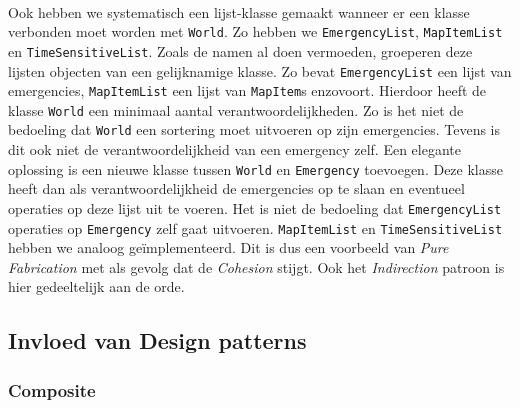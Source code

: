 \paragraph{}
Ook hebben we systematisch een lijst-klasse gemaakt wanneer er een klasse verbonden moet worden met \texttt{World}. Zo hebben we \texttt{EmergencyList}, \texttt{MapItemList} en \texttt{TimeSensitiveList}. Zoals de namen al doen vermoeden, groeperen deze lijsten objecten van een gelijknamige klasse. Zo bevat \texttt{EmergencyList} een lijst van emergencies, \texttt{MapItemList} een lijst van \texttt{MapItem}s enzovoort. Hierdoor heeft de klasse \texttt{World} een minimaal aantal verantwoordelijkheden. Zo is het niet de bedoeling dat \texttt{World} een sortering moet uitvoeren op zijn emergencies. Tevens is dit ook niet de verantwoordelijkheid van een emergency zelf. Een elegante oplossing is een nieuwe klasse tussen \texttt{World} en \texttt{Emergency} toevoegen. Deze klasse heeft dan als verantwoordelijkheid de emergencies op te slaan en eventueel operaties op deze lijst uit te voeren. Het is niet de bedoeling dat \texttt{EmergencyList} operaties op \texttt{Emergency} zelf gaat uitvoeren. \texttt{MapItemList} en \texttt{TimeSensitiveList} hebben we analoog ge\"implementeerd. Dit is dus een voorbeeld van \textit{Pure Fabrication} met als gevolg dat de \textit{Cohesion} stijgt. Ook het \textit{Indirection} patroon is hier gedeeltelijk aan de orde.
\subsection{Invloed van Design patterns}
\label{designpatterns}
\subsubsection{Composite}
